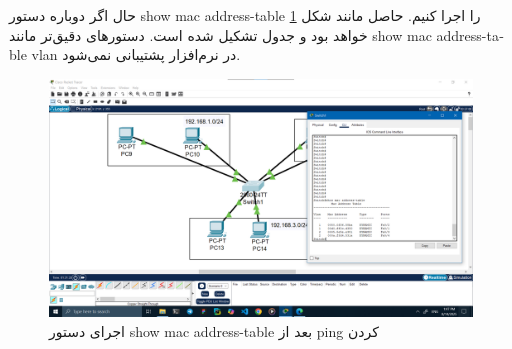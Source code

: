 \documentclass[12pt]{article}
\begin{document}
	حال اگر دوباره دستور \textenglish{show mac address-table} را اجرا کنیم. حاصل مانند شکل \ref{img:20} خواهد بود و جدول تشکیل شده است. دستور‌های دقیق‌تر مانند
	 \textenglish{show mac  address-table vlan}
	 در نرم‌افزار پشتیبانی نمی‌شود.
	\begin{figure}[H]
		\centering
		\includegraphics[width=\textwidth]{resources/20.png}
		\caption{اجرای دستور \textenglish{show mac address-table} بعد از \textenglish{ping} کردن}
		\label{img:20}
	\end{figure}
	
	\newpage
	\begin{LTR}
		\printbibliography[title={مراجع}]
	\end{LTR}
	
\end{document}
